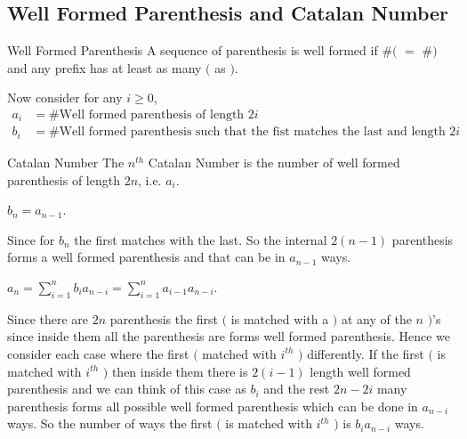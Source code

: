 \documentclass[twoside]{article}
\begin{document}
\subsection{Well Formed Parenthesis and Catalan Number}
\begin{Definition}{Well Formed Parenthesis}{}
	A sequence of parenthesis is well formed if $\#($ $=$ $\#)$ and any prefix has at least as many $($ as $)$.
\end{Definition}
Now consider for any $i\geq 0$, \begin{align*}
	a_i&=\#\text{Well formed parenthesis of length $2i$}\\
	b_i&=\#\text{Well formed parenthesis such that the fist matches the last and length $2i$}
\end{align*}
\begin{Definition}{Catalan Number}{}
	The $n^{th}$ Catalan Number is the number of  well formed parenthesis of length $2n$, i.e. $a_i$. 
\end{Definition}
\begin{observation}
	$b_n=a_{n-1}$. 
\end{observation}
Since for $b_n$ the first matches with the last. So the internal $2(n-1)$ parenthesis forms a well formed parenthesis and that can be in $a_{n-1}$ ways.

\begin{observation}
	$a_n=\sum\limits_{i=1}^nb_ia_{n-i}=\sum\limits_{i=1}^n a_{i-1}a_{n-i}$. 
\end{observation}
Since there are $2n$ parenthesis the first $($ is matched with a $)$ at any of the  $n$ $)$'s since inside them all the parenthesis are forms well formed parenthesis. Hence we consider each case where the first $($ matched with $i^{th}$ $)$ differently. If the first $($ is matched with $i^{th}$ $)$ then inside them there is $2(i-1)$ length well formed parenthesis and we can think of this case as $b_i$ and the rest $2n-2i$ many parenthesis forms all possible well formed parenthesis which can be done in $a_{n-i}$ ways. So the number of ways the first $($ is matched with $i^{th}$ $)$ is $b_ia_{n-i}$ ways.  
\end{document}

